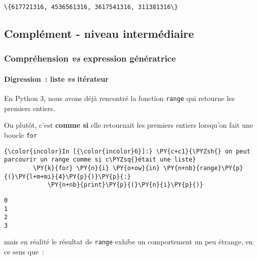     \begin{Verbatim}[commandchars=\\\{\}]
\{617721316, 4536561316, 3617541316, 311381316\}

    \end{Verbatim}

    \hypertarget{compluxe9ment---niveau-intermuxe9diaire}{%
\subsection{Complément - niveau
intermédiaire}\label{compluxe9ment---niveau-intermuxe9diaire}}

    \hypertarget{compruxe9hension-vs-expression-guxe9nuxe9ratrice}{%
\subsubsection{\texorpdfstring{Compréhension \emph{vs} expression
génératrice}{Compréhension vs expression génératrice}}\label{compruxe9hension-vs-expression-guxe9nuxe9ratrice}}

    \hypertarget{digression-liste-vs-ituxe9rateur}{%
\paragraph{\texorpdfstring{Digression~: liste \emph{vs}
itérateur}{Digression~: liste vs itérateur}}\label{digression-liste-vs-ituxe9rateur}}

    En Python 3, nous avons déjà rencontré la fonction \texttt{range} qui
retourne les premiers entiers.

Ou plutôt, c'est \textbf{comme si} elle retournait les premiers entiers
lorsqu'on fait une boucle \texttt{for}

    \begin{Verbatim}[commandchars=\\\{\}]
{\color{incolor}In [{\color{incolor}6}]:} \PY{c+c1}{\PYZsh{} on peut parcourir un range comme si c\PYZsq{}était une liste}
        \PY{k}{for} \PY{n}{i} \PY{o+ow}{in} \PY{n+nb}{range}\PY{p}{(}\PY{l+m+mi}{4}\PY{p}{)}\PY{p}{:}
            \PY{n+nb}{print}\PY{p}{(}\PY{n}{i}\PY{p}{)}
\end{Verbatim}


    \begin{Verbatim}[commandchars=\\\{\}]
0
1
2
3

    \end{Verbatim}

    mais en réalité le résultat de \texttt{range} exhibe un comportement un
peu étrange, en ce sens que~:

